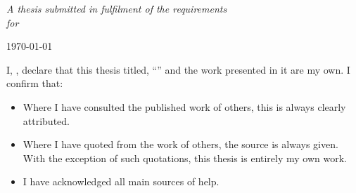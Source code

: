 \documentclass[
11pt, %
oneside, %
english, %
singlespacing, %
headsepline, %
]{Report} %
\begin{document}
\begin{titlepage}
\begin{center}
\vfill

\large \textit{A thesis submitted in fulfilment of the requirements\\ for \degreename}\\[0.3cm] %
 
\vfill

{\large \today}\\[4cm] %
 
\vfill
\end{center}
\end{titlepage}



\begin{declaration}
	\addchaptertocentry{\authorshipname} %
	\noindent I, \authorname, declare that this thesis titled, \enquote{\ttitle} and the work presented in it are my own. I confirm that:
	
	\begin{itemize} 
		\item Where I have consulted the published work of others, this is always clearly attributed.
		\item Where I have quoted from the work of others, the source is always given. With the exception of such quotations, this thesis is entirely my own work.
		\item I have acknowledged all main sources of help.
	\end{itemize}
	
	
\end{declaration}

\cleardoublepage


\end{document}
